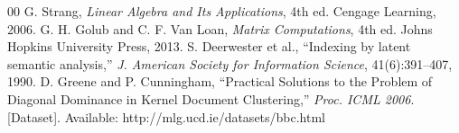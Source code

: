 \documentclass[conference]{IEEEtran}
\begin{document}
\begin{thebibliography}{00}
 G. Strang, \textit{Linear Algebra and Its Applications}, 4th ed. Cengage Learning, 2006.
 G. H. Golub and C. F. Van Loan, \textit{Matrix Computations}, 4th ed. Johns Hopkins University Press, 2013.
 S. Deerwester et al., ``Indexing by latent semantic analysis,'' \textit{J. American Society for Information Science}, 41(6):391--407, 1990.
 D. Greene and P. Cunningham, ``Practical Solutions to the Problem of Diagonal Dominance in Kernel Document Clustering,'' \textit{Proc. ICML 2006}. [Dataset]. Available: http://mlg.ucd.ie/datasets/bbc.html
\end{thebibliography}
\end{document}
